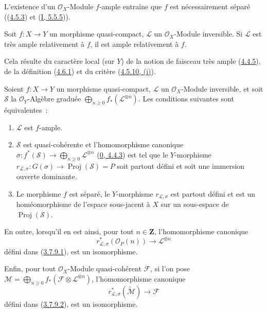 L'existence d'un $\mathcal{O}_X$-Module $f$-ample entraîne que $f$ est
nécessairement séparé ((\hyperref[II.4.5.3-fr]{4.5.3}) et
(\hyperref[I.5.5.5-fr]{I, 5.5.5})).

\begin{proposition}[4.6.2]
\label{II.4.6.2-fr}
Soit $f:X\to Y$ un morphisme quasi-compact, $\mathcal{L}$ un
$\mathcal{O}_X$-Module inversible. Si $\mathcal{L}$ est très ample
relativement à $f$, il est ample relativement à $f$.
\end{proposition}

Cela résulte du caractère local (sur $Y$) de la notion de faisceau très
ample (\hyperref[II.4.4.5-fr]{4.4.5}), de la définition
(\hyperref[II.4.6.1-fr]{4.6.1}) et du critère
(\hyperref[II.4.5.10-fr]{4.5.10, (i)}).

\begin{proposition}[4.6.3]
\label{II.4.6.3-fr}
Soient $f:X\to Y$ un morphisme quasi-compact, $\mathcal{L}$ un
$\mathcal{O}_X$-Module inversible, et soit $\mathcal{S}$ la
$\mathcal{O}_Y$-Algèbre graduée
$\bigoplus_{n\geq0}f_*(\mathcal{L}^{\otimes n})$. Les conditions suivantes
sont équivalentes~:
\begin{enumerate}
  \item[\rm{a)}] $\mathcal{L}$ est $f$-ample.
  \item[\rm{b)}] $\mathcal{S}$ est quasi-cohérente et l'homomorphisme
  canonique $\sigma:f^*(\mathcal{S})\to
  \bigoplus_{n\geq0}\mathcal{L}^{\otimes n}$
  (\hyperref[0.4.4.3-fr]{0, 4.4.3}) est tel que le $Y$-morphisme
  $r_{\mathcal{L},\sigma}:G(\sigma)\to\operatorname{Proj}(\mathcal{S})=P$
  soit partout défini et soit une immersion ouverte dominante.
  \item[\rm{b')}] Le morphisme $f$ est séparé, le $Y$-morphisme
  $r_{\mathcal{L},\sigma}$ est partout défini et est un homéomorphisme de
  l'espace sous-jacent à $X$ sur un sous-espace de
  $\operatorname{Proj}(\mathcal{S})$.
\end{enumerate}
En outre, lorsqu'il en est ainsi, pour tout $n\in\mathbf{Z}$,
l'homomorphisme canonique
\begin{equation}
\label{II.4.6.3.1-fr}
  r_{\mathcal{L},\sigma}^*(\mathcal{O}_P(n))
  \longrightarrow\mathcal{L}^{\otimes n}
\tag{4.6.3.1}
\end{equation}
défini dans (\hyperref[II.3.7.9.1-fr]{3.7.9.1}), est un isomorphisme.

Enfin, pour tout $\mathcal{O}_X$-Module quasi-cohérent $\mathcal{F}$, si
l'on pose
$\mathcal{M}=\bigoplus_{n\geq0}f_*(\mathcal{F}\otimes
\mathcal{L}^{\otimes n})$, l'homomorphisme canonique
\begin{equation}
\label{II.4.6.3.2-fr}
  r_{\mathcal{L},\sigma}^*(\widetilde{\mathcal{M}})
  \longrightarrow\mathcal{F}
\tag{4.6.3.2}
\end{equation}
défini dans (\hyperref[II.3.7.9.2-fr]{3.7.9.2}), est un isomorphisme.
\end{proposition}

